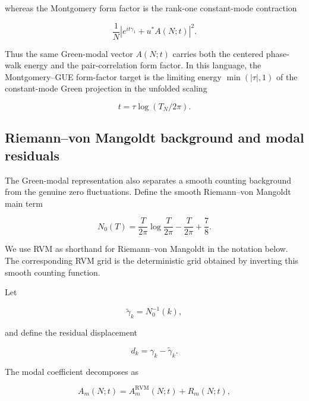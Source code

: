 \documentclass[11pt]{amsart}
\numberwithin{equation}{section}
\theoremstyle{plain}
\theoremstyle{definition}
\theoremstyle{remark}
\begin{document}
whereas the Montgomery form factor is the rank-one constant-mode
contraction

\begin{equation}
\frac1N
\left|
e^{it\gamma_1}+u^*A(N;t)
\right|^2.
\label{eq:form_factor_rank_one_contraction}
\end{equation}

Thus the same Green-modal vector \(A(N;t)\) carries both the centered
phase-walk energy and the pair-correlation form factor. In this
language, the Montgomery--GUE form-factor target is the limiting energy
\(\min(|\tau|,1)\) of the constant-mode Green projection in the unfolded
scaling

\begin{equation}
t=\tau\log(T_N/2\pi).
\label{eq:form_factor_unfolded_scaling_final}
\end{equation}

\subsection{Riemann--von Mangoldt background and modal residuals}
\label{subsec:rvm_background_modal_residuals}

The Green-modal representation also separates a smooth counting
background from the genuine zero fluctuations. Define the smooth
Riemann--von Mangoldt main term

\begin{equation}
N_0(T)
=
\frac{T}{2\pi}\log\frac{T}{2\pi}
-
\frac{T}{2\pi}
+
\frac78.
\label{eq:rvm_smooth_counting_function}
\end{equation}

We use RVM as shorthand for Riemann--von Mangoldt in the notation below.
The corresponding RVM grid is the deterministic grid obtained by
inverting this smooth counting function.

Let

\begin{equation}
\widetilde\gamma_k=N_0^{-1}(k),
\label{eq:rvm_grid_ordinate}
\end{equation}

and define the residual displacement

\begin{equation}
d_k=\gamma_k-\widetilde\gamma_k.
\label{eq:rvm_residual_displacement}
\end{equation}

The modal coefficient decomposes as

\begin{equation}
A_m(N;t)
=
A_m^{\mathrm{RVM}}(N;t)+R_m(N;t),
\label{eq:rvm_modal_decomposition}
\end{equation}
\end{document}
